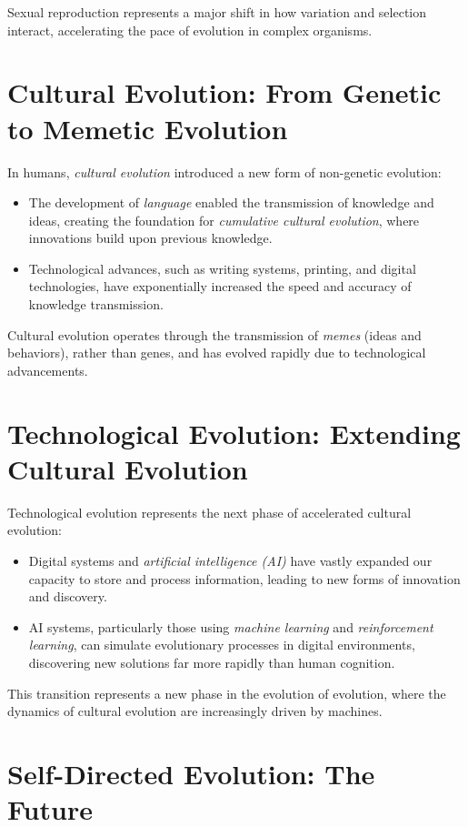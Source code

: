 \documentclass[12pt,titlepage]{book}
\begin{document}
Sexual reproduction represents a major shift in how variation and selection interact, accelerating the pace of evolution in complex organisms.

\section{Cultural Evolution: From Genetic to Memetic Evolution}

In humans, \textit{cultural evolution} introduced a new form of non-genetic evolution:
\begin{itemize}
    \item The development of \textit{language} enabled the transmission of knowledge and ideas, creating the foundation for \textit{cumulative cultural evolution}, where innovations build upon previous knowledge.
    \item Technological advances, such as writing systems, printing, and digital technologies, have exponentially increased the speed and accuracy of knowledge transmission.
\end{itemize}

Cultural evolution operates through the transmission of \textit{memes} (ideas and behaviors), rather than genes, and has evolved rapidly due to technological advancements.

\section{Technological Evolution: Extending Cultural Evolution}

Technological evolution represents the next phase of accelerated cultural evolution:
\begin{itemize}
    \item Digital systems and \textit{artificial intelligence (AI)} have vastly expanded our capacity to store and process information, leading to new forms of innovation and discovery.
    \item AI systems, particularly those using \textit{machine learning} and \textit{reinforcement learning}, can simulate evolutionary processes in digital environments, discovering new solutions far more rapidly than human cognition.
\end{itemize}

This transition represents a new phase in the evolution of evolution, where the dynamics of cultural evolution are increasingly driven by machines.

\section{Self-Directed Evolution: The Future}
\end{document}
